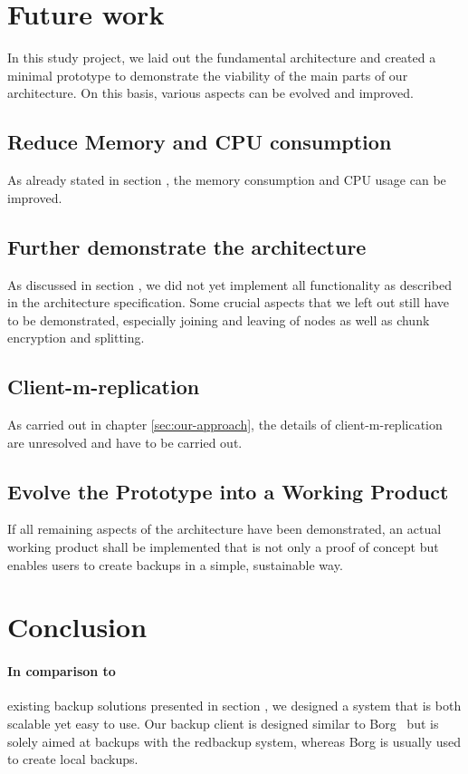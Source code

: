 \section{Future work}

In this study project, we laid out the fundamental architecture and created a minimal prototype to demonstrate the viability of the main parts of our architecture. On this basis, various aspects can be evolved and improved.

\subsection{Reduce Memory and CPU consumption}
As already stated in section , the memory consumption and CPU usage can be improved.

\subsection{Further demonstrate the architecture}

As discussed in section , we did not yet implement all functionality as described in the architecture specification. Some crucial aspects that we left out still have to be demonstrated, especially joining and leaving of nodes as well as chunk encryption and splitting.

\subsection{Client-m-replication}
As carried out in chapter \ref{sec:our-approach}, the details of \gls{client-m-replication} are unresolved and have to be carried out.

\subsection{Evolve the Prototype into a Working Product}
If all remaining aspects of the architecture have been demonstrated, an actual working product shall be implemented that is not only a proof of concept but enables users to create backups in a simple, sustainable way.

\section{Conclusion}
\paragraph{In comparison to}
existing backup solutions presented in section , we designed a system that is both scalable yet easy to use. Our backup \gls{client} is designed similar to Borg~\cite{borg-backup} but is solely aimed at backups with the redbackup system, whereas Borg is usually used to create local backups.

